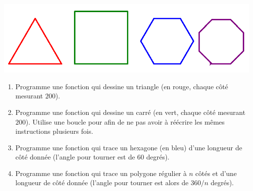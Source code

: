 \documentclass[11pt,class=report,crop=false]{standalone}
\begin{document}
\begin{activite}[Tortue]


\begin{center}
\includegraphics[scale=\myscale,scale=0.4]{ecran-fonctions-tortue}
\end{center}

\begin{enumerate}
  \item Programme une fonction  qui dessine un triangle (en rouge, chaque côté mesurant $200$).

  \item Programme une fonction  qui dessine un carré (en vert, chaque côté mesurant $200$). Utilise une boucle \og{}pour\fg{} afin de ne pas avoir à réécrire les mêmes instructions plusieurs fois.  
  
  \item Programme une fonction  qui trace un hexagone (en bleu) d'une longueur de côté donnée (l'angle pour tourner est de $60$ degrés).
  
  
  \item Programme une fonction  qui trace un polygone régulier à $n$ côtés et d'une longueur de côté donnée (l'angle pour tourner est alors de $360/n$ degrés). 
\end{enumerate}

\end{activite}




\end{document}
